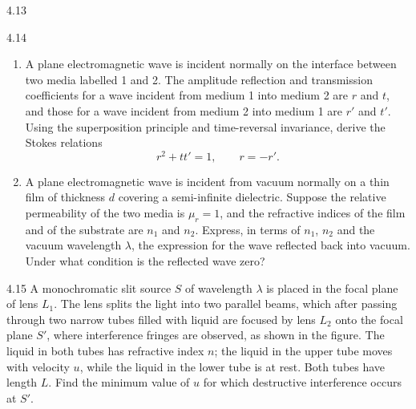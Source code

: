 \begin{figbox}{4.13}
\end{figbox}

\begin{problem}{4.14}
\begin{enumerate}[label=(\arabic*),leftmargin=2.2em,itemsep=4pt,topsep=2pt]
\item A plane electromagnetic wave is incident normally on the interface between two media labelled 1 and 2. The amplitude reflection and transmission coefficients for a wave incident from medium 1 into medium 2 are $r$ and $t$, and those for a wave incident from medium 2 into medium 1 are $r'$ and $t'$. Using the superposition principle and time-reversal invariance, derive the Stokes relations
\[
r^2+tt'=1,\qquad r=-r'.
\]
\item A plane electromagnetic wave is incident from vacuum normally on a thin film of thickness $d$ covering a semi-infinite dielectric. Suppose the relative permeability of the two media is $\mu_r=1$, and the refractive indices of the film and of the substrate are $n_1$ and $n_2$. Express, in terms of $n_1$, $n_2$ and the vacuum wavelength $\lambda$, the expression for the wave reflected back into vacuum. Under what condition is the reflected wave zero?
\end{enumerate}
\end{problem}

\begin{problem}{4.15}
A monochromatic slit source $S$ of wavelength $\lambda$ is placed in the focal plane of lens $L_1$. The lens splits the light into two parallel beams, which after passing through two narrow tubes filled with liquid are focused by lens $L_2$ onto the focal plane $S'$, where interference fringes are observed, as shown in the figure. The liquid in both tubes has refractive index $n$; the liquid in the upper tube moves with velocity $u$, while the liquid in the lower tube is at rest. Both tubes have length $L$. Find the minimum value of $u$ for which destructive interference occurs at $S'$.
\end{problem}


